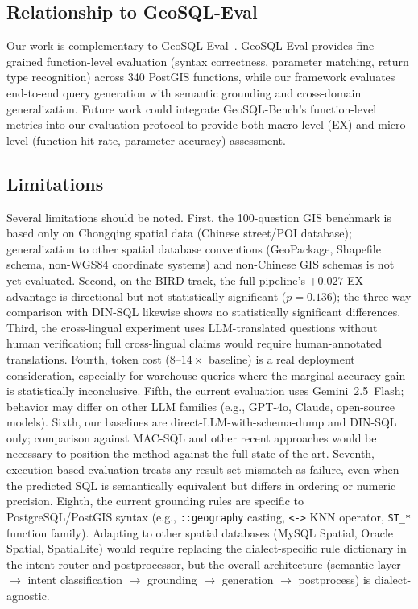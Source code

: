 \documentclass[11pt]{article}
\begin{document}
\subsection{Relationship to GeoSQL-Eval}

Our work is complementary to GeoSQL-Eval~\cite{hou2025geosql}. GeoSQL-Eval provides fine-grained function-level evaluation (syntax correctness, parameter matching, return type recognition) across 340 PostGIS functions, while our framework evaluates end-to-end query generation with semantic grounding and cross-domain generalization. Future work could integrate GeoSQL-Bench's function-level metrics into our evaluation protocol to provide both macro-level (EX) and micro-level (function hit rate, parameter accuracy) assessment.

\subsection{Limitations}

Several limitations should be noted. First, the 100-question GIS benchmark is based only on Chongqing spatial data (Chinese street/POI database); generalization to other spatial database conventions (GeoPackage, Shapefile schema, non-WGS84 coordinate systems) and non-Chinese GIS schemas is not yet evaluated. Second, on the BIRD track, the full pipeline's $+0.027$ EX advantage is directional but not statistically significant ($p=0.136$); the three-way comparison with DIN-SQL likewise shows no statistically significant differences. Third, the cross-lingual experiment uses LLM-translated questions without human verification; full cross-lingual claims would require human-annotated translations. Fourth, token cost ($8$--$14\times$ baseline) is a real deployment consideration, especially for warehouse queries where the marginal accuracy gain is statistically inconclusive. Fifth, the current evaluation uses Gemini~2.5~Flash; behavior may differ on other LLM families (e.g., GPT-4o, Claude, open-source models). Sixth, our baselines are direct-LLM-with-schema-dump and DIN-SQL only; comparison against MAC-SQL and other recent approaches would be necessary to position the method against the full state-of-the-art. Seventh, execution-based evaluation treats any result-set mismatch as failure, even when the predicted SQL is semantically equivalent but differs in ordering or numeric precision. Eighth, the current grounding rules are specific to PostgreSQL/PostGIS syntax (e.g., \texttt{::geography} casting, \texttt{<->} KNN operator, \texttt{ST\_*} function family). Adapting to other spatial databases (MySQL Spatial, Oracle Spatial, SpatiaLite) would require replacing the dialect-specific rule dictionary in the intent router and postprocessor, but the overall architecture (semantic layer $\to$ intent classification $\to$ grounding $\to$ generation $\to$ postprocess) is dialect-agnostic.
\end{document}
